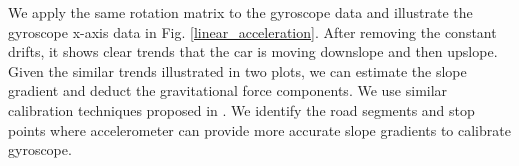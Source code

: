 We apply the same rotation matrix to the gyroscope data and 
illustrate the gyroscope x-axis data in Fig. \ref{linear_acceleration}.
After removing the constant drifts, 
it shows clear trends that the car is moving downslope and then
upslope.
Given the similar trends illustrated in two plots, 
we can estimate the slope gradient and deduct the gravitational force
components. 
We use similar calibration techniques proposed in \cite{zhou2014use}. 
We identify the road segments and stop points where accelerometer
can provide more accurate slope gradients to calibrate gyroscope.  


